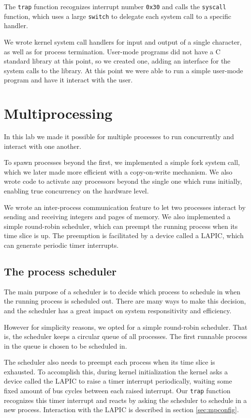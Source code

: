 \documentclass{report}
\begin{document}
The \texttt{trap} function recognizes interrupt number \texttt{0x30} and calls the
\texttt{syscall} function, which uses a large \texttt{switch} to delegate each
system call to a specific handler.

We wrote kernel system call handlers for input and output of a single
character, as well as for process termination. User-mode programs did not have
a C standard library at this point, so we created one, adding an interface for
the system calls to the library. At this point we were able to run a simple
user-mode program and have it interact with the user. 



\chapter{Multiprocessing}
In this lab we made it possible for multiple processes to run concurrently and
interact with one another. 

To spawn processes beyond the first, we implemented a simple fork system call,
which we later made more efficient with a copy-on-write mechanism. We also
wrote code to activate any processors beyond the single one which runs
initially, enabling true concurrency on the hardware level. 

We wrote an inter-process communication feature to let two processes interact
by sending and receiving integers and pages of memory. We also implemented a
simple round-robin scheduler, which can preempt the running process when its
time slice is up. The preemption is facilitated by a device called a LAPIC,
which can generate periodic timer interrupts.






\section{The process scheduler}
\label{sec:preempt}
The main purpose of a scheduler is to decide which process to schedule in when
the running process is scheduled out. There are many ways to make this
decision, and the scheduler has a great impact on system responsitivity and
efficiency. 

However for simplicity reasons, we opted for a simple round-robin scheduler.
That is, the scheduler keeps a circular queue of all processes. The first
runnable process in the queue is chosen to be scheduled in.

The scheduler also needs to preempt each process when its time slice is
exhausted. To accomplish this, during kernel initialization the kernel asks a
device called the LAPIC to raise a timer interrupt periodically, waiting some
fixed amount of bus cycles between each raised interrupt. Our \texttt{trap}
function recognizes this timer interrupt and reacts by asking the scheduler to
schedule in a new process. Interaction with the LAPIC is described in section
\ref{sec:mpconfig}.
\end{document}
